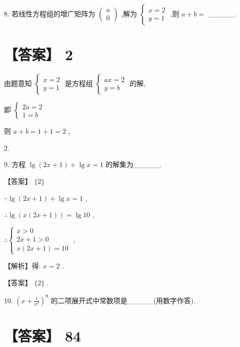 \documentclass[10pt]{article}
\begin{document}
8. 若线性方程组的增广矩阵为 \(\left( \begin{array}{l} a \\  0 \end{array}\right)\) ,解为 \(\left\{  \begin{array}{l} x = 2 \\  y = 1 \end{array}\right.\) ,则 \(a + b =\) \_\_\_\_\_.

\section*{【答案】 2}

由题意知 \(\left\{  \begin{array}{l} x = 2 \\  y = 1 \end{array}\right.\) 是方程组 \(\left\{  \begin{array}{l} {ax} = 2 \\  y = b \end{array}\right.\) 的解,

即 \(\left\{  \begin{array}{l} {2a} = 2 \\  1 = b \end{array}\right.\)

则 \(a + b = 1 + 1 = 2\) ,

2.

9. 方程 \(\lg \left( {{2x} + 1}\right)  + \lg x = 1\) 的解集为\_\_\_\_\_.

【答案】 \(\{ 2\}\)

\(\because \lg \left( {{2x} + 1}\right)  + \lg x = 1\) ,

\(\therefore \lg \left( {x\left( {{2x} + 1}\right) }\right)  = \lg {10}\) ,

\(\therefore \left\{  \begin{array}{l} x > 0 \\  {2x} + 1 > 0 \\  x\left( {{2x} + 1}\right)  = {10} \end{array}\right.\) ,

【解析】得: \(x = 2\) .

【答案】 \(\{ 2\}\) .

10. \({\left( x + \frac{1}{{x}^{2}}\right) }^{9}\) 的二项展开式中常数项是\_\_\_\_\_(用数字作答).

\section*{【答案】 84}
\end{document}

